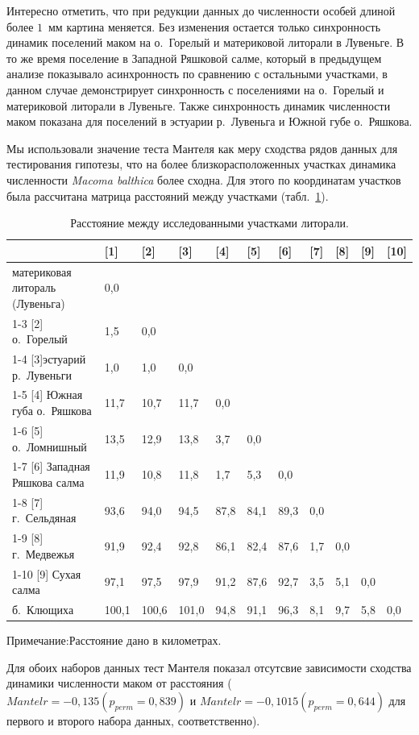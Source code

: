 \documentclass[12pt, a4paper]{disser}
\begin{document}
Интересно отметить, что при редукции данных до численности особей длиной более $1$~мм картина меняется.
Без изменения остается только синхронность динамик поселений маком на о.~Горелый и материковой литорали в Лувеньге.
В то же время поселение в Западной Ряшковой салме, который в предыдущем анализе показывало асинхронность по сравнению с остальными участками, в данном случае демонстрирует синхронность с поселениями на о.~Горелый и материковой литорали в Лувеньге.
Также синхронность динамик численности маком показана для поселений в эстуарии р.~Лувеньга и Южной губе о.~Ряшкова.

Мы использовали значение теста Мантеля как меру сходства рядов данных для тестирования гипотезы, что на более близкорасположенных участках динамика численности {\it Macoma balthica} более сходна.
Для этого по координатам участков была рассчитана матрица расстояний между участками (табл.~\ref{tab:distance_area_km}).
	\begin{table}[ht]
	\caption{Расстояние между исследованными участками литорали.}
	\label{tab:distance_area_km}
        \begin{tabular}{|p{}|*{10}{p{}|}} \hline
	 & [1] & [2] & [3] & [4] & [5] & [6] & [7] & [8] & [9] & [10]
	\\ \hline
	[1] материковая литораль (Лувеньга) & 0,0 &  &  &  &  &  &  &  &  & 
	\\ \cline{1-3}
	[2] о.~Горелый & 1,5 & 0,0 &  &  &  &  &  &  &  &  
	\\ \cline{1-4}
	[3]эстуарий р.~Лувеньги & 1,0 & 1,0 & 0,0 &  &  &  &  &  &  &  
	\\ \cline{1-5}
	[4] Южная губа о.~Ряшкова & 11,7 & 10,7 & 11,7 & 0,0 &  &  &  &  &  & 
	\\ \cline{1-6}
	[5] о.~Ломнишный & 13,5 & 12,9 & 13,8 & 3,7 & 0,0 &  &  &  &  &  
	\\ \cline{1-7}
	[6] Западная Ряшкова салма & 11,9 & 10,8 & 11,8 & 1,7 & 5,3 & 0,0 &  &  &  &  
	\\ \cline{1-8}
	[7] г.~Сельдяная & 93,6 & 94,0 & 94,5 & 87,8 & 84,1 & 89,3 & 0,0 &  &  &  
	\\ \cline{1-9}
	[8] г.~Медвежья & 91,9 & 92,4 & 92,8 & 86,1 & 82,4 & 87,6 & 1,7 & 0,0 &  &  
	\\ \cline{1-10}
	[9] Сухая салма & 97,1 & 97,5 & 97,9 & 91,2 & 87,6 & 92,7 & 3,5 & 5,1 & 0,0 &  
	\\ \hline
	[10] б.~Клющиха & 100,1 & 100,6 & 101,0 & 94,8 & 91,1 & 96,3 & 8,1 & 9,7 & 5,8 & 0,0
	\\ \hline
	\end{tabular}
	   {\footnotesize Примечание:Расстояние дано в километрах.}
	\end{table}

Для обоих наборов данных тест Мантеля показал отсутсвие зависимости сходства динамики численности маком от расстояния ( $Mantel r = -0,135 (p_{perm} = 0,839)$ и $Mantel r = -0,1015 (p_{perm} = 0,644)$ для первого и второго набора данных, соответственно).
\end{document}
